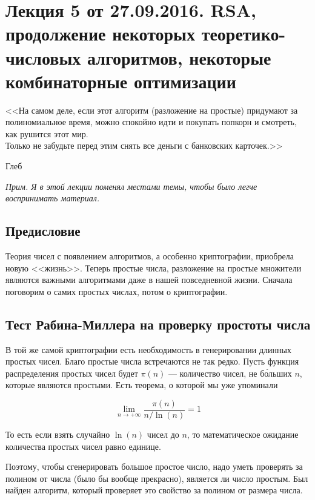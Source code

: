 
% 

\section{Лекция 5 от 27.09.2016. RSA, продолжение некоторых теоретико-числовых
алгоритмов, некоторые комбинаторные оптимизации}
\epigraph{<<На самом деле, если этот алгоритм (разложение на простые) 
придумают за полиномиальное время, можно спокойно идти и покупать
попкорн и смотреть, как рушится этот мир.
\\
Только не забудьте перед этим снять все деньги с банковских карточек.>>}
{Глеб}

\textit{Прим. Я в этой лекции поменял местами темы, чтобы было легче воспринимать
материал.}

\subsection{Предисловие}

Теория чисел с появлением алгоритмов, а особенно криптографии, приобрела новую 
<<жизнь>>. Теперь простые числа, разложение на простые множители являются
важными алгоритмами даже в нашей повседневной жизни. Сначала поговорим о самих
простых числах, потом о криптографии.

\subsection{Тест Рабина-Миллера на проверку простоты числа}

В той же самой криптографии есть необходимость в генерировании длинных простых
чисел. Благо простые числа встречаются не так редко. Пусть
функция распределения простых чисел будет $\pi(n)$ --- количество
чисел, не б\'{о}льших $n$, которые являются простыми. Есть теорема, о которой
мы уже упоминали

\[
  \lim\limits_{n \to +\infty} \frac{\pi(n)}{n/\ln(n)} = 1
\]

То есть если взять случайно $\ln(n)$ чисел до $n$, то математическое ожидание
количества простых чисел равно единице.

Поэтому, чтобы сгенерировать большое простое число, надо уметь проверять за
полином от числа (было бы вообще прекрасно), является ли число простым. Был
найден алгоритм, который проверяет это свойство за полином от размера числа.

